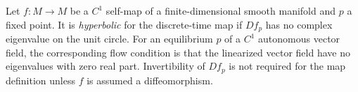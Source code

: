 
Let $f:M\to M$ be a $C^1$ self-map of a finite-dimensional smooth manifold and $p$ a fixed point. It is \emph{hyperbolic} for the discrete-time map if $Df_p$ has no complex eigenvalue on the unit circle. For an equilibrium $p$ of a $C^1$ autonomous vector field, the corresponding flow condition is that the linearized vector field have no eigenvalues with zero real part. Invertibility of $Df_p$ is not required for the map definition unless $f$ is assumed a diffeomorphism.
